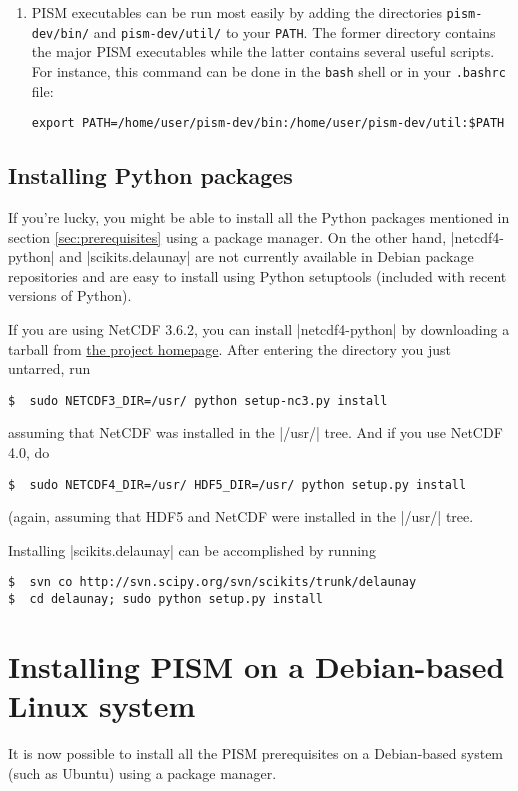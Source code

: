 \documentclass[11pt,final]{amsart}
\begin{document}
\begin{enumerate}
\item PISM executables can be run most easily by adding the directories \verb|pism-dev/bin/| and \verb|pism-dev/util/| to your \verb|PATH|.  The former directory contains the major PISM executables while the latter contains several useful scripts.  For instance, this command can be done in the \verb|bash| shell or in your \verb|.bashrc| file:
\begin{verbatim}
export PATH=/home/user/pism-dev/bin:/home/user/pism-dev/util:$PATH
\end{verbatim}
\end{enumerate}


\subsection{Installing Python packages}
\label{sec:recommended}

If you're lucky, you might be able to install all the Python packages mentioned in section \ref{sec:prerequisites} using a package
manager. On the other hand, |netcdf4-python| and |scikits.delaunay| are not currently available in Debian package repositories and
are easy to install using Python setuptools (included with recent versions of Python).

If you are using NetCDF 3.6.2, you can install |netcdf4-python| by downloading a tarball from
\href{http://code.google.com/p/netcdf4-python/}{the project homepage}. After entering the directory you just untarred, run
\begin{verbatim}
$  sudo NETCDF3_DIR=/usr/ python setup-nc3.py install
\end{verbatim}
assuming that NetCDF was installed in the |/usr/| tree. And if you use NetCDF 4.0, do
\begin{verbatim}
$  sudo NETCDF4_DIR=/usr/ HDF5_DIR=/usr/ python setup.py install
\end{verbatim}
(again, assuming that HDF5 and NetCDF were installed in the |/usr/| tree.

\bigskip
Installing |scikits.delaunay| can be accomplished by running
\begin{verbatim}
$  svn co http://svn.scipy.org/svn/scikits/trunk/delaunay
$  cd delaunay; sudo python setup.py install
\end{verbatim}

\clearpage
\section{Installing PISM on a Debian-based Linux system}
\label{sec:debian}
It is now possible to install all the PISM prerequisites on a Debian-based system (such as Ubuntu) using a package manager.
\end{document}
